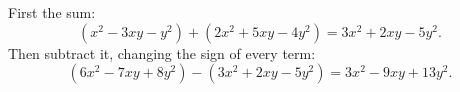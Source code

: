 First the sum:
\[
(x^2-3xy-y^2)+(2x^2+5xy-4y^2)=3x^2+2xy-5y^2 .
\]
Then subtract it, changing the sign of every term:
\[
(6x^2-7xy+8y^2)-(3x^2+2xy-5y^2)=\boxed{3x^2-9xy+13y^2}.
\]
